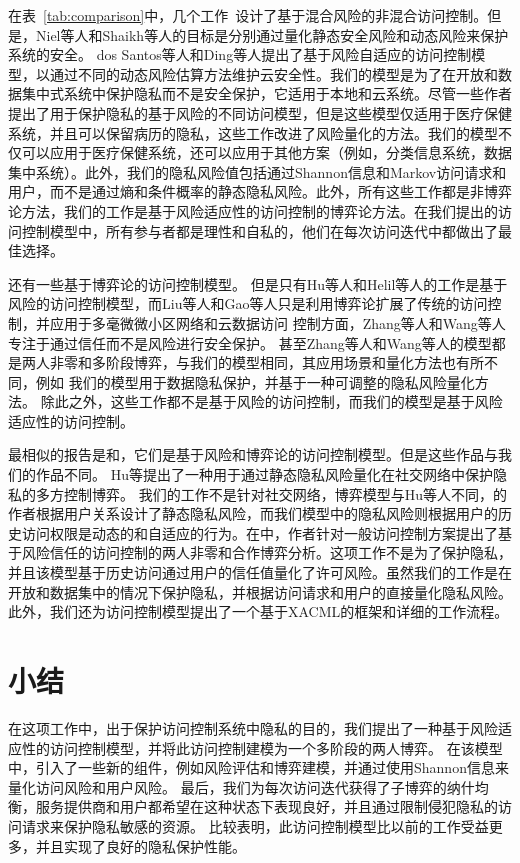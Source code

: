 在表~\ref{tab:comparison}中，几个工作~\cite{ni2010risk,shaikh2012dynamic,santos2016,ding2019,wang2011quantified,zhang2018privacy,zhen2015}设计了基于混合风险的非混合访问控制。但是，Niel等人\cite{ni2010risk}和Shaikh等人\cite{shaikh2012dynamic}的目标是分别通过量化静态安全风险和动态风险来保护系统的安全。 dos Santos等人\cite{santos2016}和Ding等人\cite{ding2019}提出了基于风险自适应的访问控制模型，以通过不同的动态风险估算方法维护云安全性。我们的模型是为了在开放和数据集中式系统中保护隐私而不是安全保护，它适用于本地和云系统。尽管一些作者\cite{wang2011quantified,zhen2015,zhang2018privacy}提出了用于保护隐私的基于风险的不同访问模型，但是这些模型仅适用于医疗保健系统，并且可以保留病历的隐私，这些工作改进了风险量化的方法。我们的模型不仅可以应用于医疗保健系统，还可以应用于其他方案（例如，分类信息系统，数据集中系统）。此外，我们的隐私风险值包括通过Shannon信息和Markov访问请求和用户，而不是通过熵\cite{zhen2015}和条件概率\cite{zhang2018privacy}的静态隐私风险\cite{wang2011quantified}。此外，所有这些工作都是非博弈论方法，我们的工作是基于风险适应性的访问控制的博弈论方法。在我们提出的访问控制模型中，所有参与者都是理性和自私的，他们在每次访问迭代中都做出了最佳选择。


还有一些基于博弈论的访问控制模型\cite{liu2016dynamic,gao2018game,zhang2015towards,wang2019,hu2014game,helil2017non}。 但是只有Hu等人\cite{hu2014game}和Helil等人\cite{helil2017non}的工作是基于风险的访问控制模型，而Liu等人\cite{liu2016dynamic}和Gao等人\cite{gao2018game}只是利用博弈论扩展了传统的访问控制，并应用于多毫微微小区网络和云数据访问 控制方面，Zhang等人\cite{zhang2015towards}和Wang等人\cite{wang2019}专注于通过信任而不是风险进行安全保护。 甚至Zhang等人和Wang等人的模型都是两人非零和多阶段博弈，与我们的模型相同，其应用场景和量化方法也有所不同，例如 我们的模型用于数据隐私保护，并基于一种可调整的隐私风险量化方法。 除此之外，这些工作\cite{liu2016dynamic,gao2018game,zhang2015towards,wang2019}都不是基于风险的访问控制，而我们的模型是基于风险适应性的访问控制。

最相似的报告是\cite{hu2014game}和\cite{helil2017non}，它们是基于风险和博弈论的访问控制模型。但是这些作品与我们的作品不同。 Hu等\cite{hu2014game}提出了一种用于通过静态隐私风险量化在社交网络中保护隐私的多方控制博弈。
我们的工作不是针对社交网络，博弈模型与Hu等人\cite{hu2014game}不同，\cite{hu2014game}的作者根据用户关系设计了静态隐私风险，而我们模型中的隐私风险则根据用户的历史访问权限是动态的和自适应的行为。在\cite{helil2017non}中，作者针对一般访问控制方案提出了基于风险信任的访问控制的两人非零和合作博弈分析。这项工作不是为了保护隐私，并且该模型基于历史访问通过用户的信任值量化了许可风险。虽然我们的工作是在开放和数据集中的情况下保护隐私，并根据访问请求和用户的直接量化隐私风险。此外，我们还为访问控制模型提出了一个基于XACML的框架和详细的工作流程。

\section{小结}\label{sec:conclusions}

在这项工作中，出于保护访问控制系统中隐私的目的，我们提出了一种基于风险适应性的访问控制模型，并将此访问控制建模为一个多阶段的两人博弈。 在该模型中，引入了一些新的组件，例如风险评估和博弈建模，并通过使用Shannon信息来量化访问风险和用户风险。 最后，我们为每次访问迭代获得了子博弈的纳什均衡，服务提供商和用户都希望在这种状态下表现良好，并且通过限制侵犯隐私的访问请求来保护隐私敏感的资源。 比较表明，此访问控制模型比以前的工作受益更多，并且实现了良好的隐私保护性能。